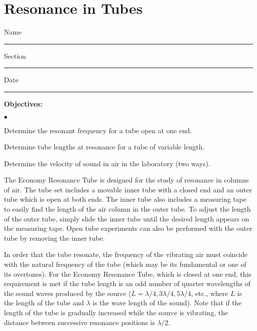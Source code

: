 
\section{Resonance in Tubes}

Name \rule{2.0in}{0.1pt}\hfill{}Section \rule{1.0in}{0.1pt}\hfill{}Date \rule{1.0in}{0.1pt}



{\noindent \bf Objectives:} \begin{list}{$\bullet$}{\itemsep0pt }

\item Determine the resonant frequency for a tube open at one end.

\item Determine tube lengths at resonance for a tube of variable length.

\item Determine the velocity of sound in air in the laboratory (two ways).

\end{list}


The Economy Resonance Tube is designed for the study of resonance in columns of air.  The tube set includes a movable inner tube with a closed end and an outer tube which is open at both ends.  The inner tube also includes a measuring tape to easily find the length of the air column in the outer tube. To adjust the length of the outer tube, simply slide the inner tube until the desired length appears on the measuring tape.  Open tube experiments can also be performed with the outer tube by removing the inner tube.

\noindent In order that the tube resonate, the frequency of the vibrating air must coincide with the natural frequency of the tube (which may be its fundamental or one of its overtones). For the Economy Resonance Tube, which is closed at one end, this requirement is met if the tube length is an odd number of quarter wavelengths of the sound waves produced by the source ($L = \lambda/4, 3 \lambda/4, 5 \lambda/4$, etc., where $L$ is the length of the tube and $\lambda$ is the wave length of the sound). Note that if the length of the tube is gradually increased while the source is vibrating, the distance between successive resonance positions is $\lambda/2$. \\

 \\


